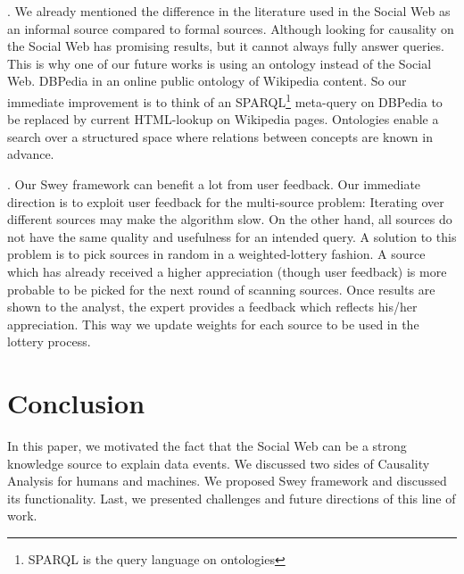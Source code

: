 \documentclass[conference]{IEEEtran}
\begin{document}
\vspace{5pt}
. We already mentioned the difference in the literature used in the Social Web as an informal source compared to formal sources. Although looking for causality on the Social Web has promising results, but it cannot always fully answer queries. This is why one of our future works is using an ontology instead of the Social Web. DBPedia in an online public ontology of Wikipedia content. So our immediate improvement is to think of an SPARQL\footnote{SPARQL is the query language on ontologies} meta-query on DBPedia to be replaced by current HTML-lookup on Wikipedia pages. Ontologies enable a search over a structured space where relations between concepts are known in advance.

\vspace{5pt}
. Our {\sc Swey} framework can benefit a lot from user feedback. Our immediate direction is to exploit user feedback for the multi-source problem: Iterating over different sources may make the algorithm slow. On the other hand, all sources do not have the same quality and usefulness for an intended query. A solution to this problem is to pick sources in random in a weighted-lottery fashion. A source which has already received a higher appreciation (though user feedback) is more probable to be picked for the next round of scanning sources. Once results are shown to the analyst, the expert provides a feedback which reflects his/her appreciation. This way we update weights for each source to be used in the lottery process.

\section{Conclusion}
\label{sec:conc}
In this paper, we motivated the fact that the Social Web can be a strong knowledge source to explain data events. We discussed two sides of Causality Analysis for humans and machines. We proposed {\sc Swey} framework and discussed its functionality. Last, we presented challenges and future directions of this line of work.



\end{document}
